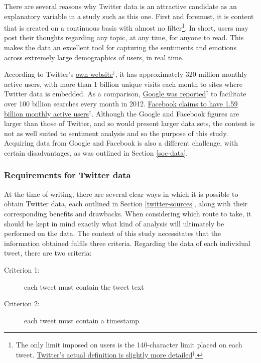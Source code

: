 \documentclass{article}
\begin{document}
There are several reasons why Twitter data is an attractive candidate as an explanatory variable in a study such as this one. First and foremost, it is content that is created on a continuous basis with almost no filter\footnote{The only limit imposed on users is the 140-character limit placed on each tweet. \href{https://dev.twitter.com/overview/api/counting-characters}{Twitter's actual definition is slightly more detailed$^{\dag{}}$.}}. In short, users may post their thoughts regarding any topic, at any time, for anyone to read. This makes the data an excellent tool for capturing the sentiments and emotions across extremely large demographics of users, in real time.

According to Twitter's \href{https://about.twitter.com/company}{own website$^{\dag{}}$}, it has approximately 320 million monthly active users, with more than 1 billion unique visits each month to sites where Twitter data is embedded. As a comparison, \href{http://www.internetlivestats.com/google-search-statistics/}{Google was reported$^{\dag{}}$} to facilitate over 100 billion searches every month in 2012. \href{http://newsroom.fb.com/company-info/}{Facebook claims to have 1.59 billion monthly active users$^{\dag{}}$}. Although the Google and Facebook figures are larger than those of Twitter, and so would present larger data sets, the content is not as well suited to sentiment analysis and so the purpose of this study. Acquiring data from Google and Facebook is also a different challenge, with certain disadvantages, as was outlined in Section \ref{soc-data}.


\subsubsection{Requirements for Twitter data \label{criteria}}
\label{sec-3-2-2}

At the time of writing, there are several clear ways in which it is possible to obtain Twitter data, each outlined in Section \ref{twitter-sources}, along with their corresponding benefits and drawbacks. When considering which route to take, it should be kept in mind exactly what kind of analysis will ultimately be performed on the data. The context of this study necessitates that the information obtained fulfils three criteria. Regarding the data of each individual tweet, there are two criteria:

\begin{description}
\item[{Criterion 1:}] each tweet must contain the tweet text

\item[{Criterion 2:}] each tweet must contain a timestamp
\end{description}
\end{document}
